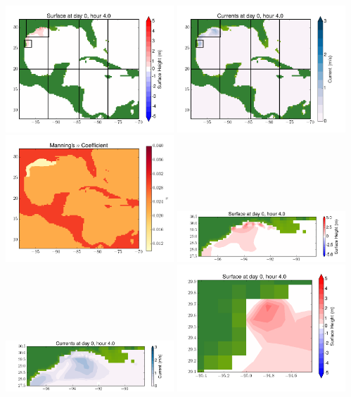 \documentclass[11pt]{article}
\begin{document}
\vskip 10pt 
\includegraphics[width=0.475\textwidth]{frame0076fig1.png}
\includegraphics[width=0.475\textwidth]{frame0076fig2.png}
\vskip 10pt 
\includegraphics[width=0.475\textwidth]{frame0076fig3.png}
\includegraphics[width=0.475\textwidth]{frame0076fig4.png}
\vskip 10pt 
\includegraphics[width=0.475\textwidth]{frame0076fig5.png}
\includegraphics[width=0.475\textwidth]{frame0076fig6.png}
\end{document}
